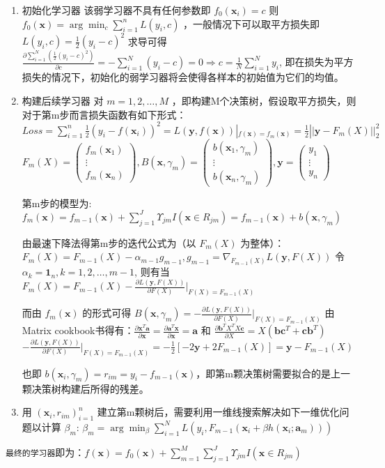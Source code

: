 \documentclass[
  letterpaper,
  DIV=11,
  numbers=noendperiod]{scrartcl}
\begin{document}
\begin{enumerate}
\def\labelenumi{\arabic{enumi}.}
\item
  初始化学习器 该弱学习器不具有任何参数即 \(f_0(\mathbf{x}_i)=c\) 则
  \(f_0(\mathbf x)=\arg\min_c\sum_{i=1}^n L(y_i,c)\)
  ，一般情况下可以取平方损失即 \(L(y_i,c)=\frac 12(y_i-c)^2\) 求导可得
  \(\frac{\partial \sum_{i=1}^N(\frac 12 (y_i-c)^2)}{\partial c}=-\sum_{i=1}^N(y_i-c)=0\Rightarrow c=\frac 1N\sum_{i=1}^N y_i\),
  即在损失为平方损失的情况下，初始化的弱学习器将会使得各样本的初始值为它们的均值。
\item
  构建后续学习器 对 \(m=1,2,\ldots,M\)
  ，即构建M个决策树，假设取平方损失，则对于第m步而言损失函数有如下形式：
  \(Loss=\sum_{i=1}^n\frac 12(y_i-f(\mathbf{x}_i))^2=L(\mathbf{y},f(\mathbf{x}))|_{f(\mathbf{x})=f_{m}(\mathbf{x})}=\frac12||\mathbf y-F_m(X)||_2^2\)
  \(F_m(X)=\begin{pmatrix}f_m(\mathbf x_1)\\\vdots\\f_m(\mathbf x_n)\end{pmatrix},B(\mathbf x,\gamma_m)=\begin{pmatrix}b(\mathbf x_1,\gamma_m)\\\vdots\\b(\mathbf x_n,\gamma_m)\end{pmatrix},\mathbf y=\begin{pmatrix}y_1\\\vdots\\ y_n\end{pmatrix}\)

  第m步的模型为:
  \(f_m(\mathbf{x})=f_{m-1}(\mathbf{x})+\sum_{j=1}^J\Upsilon_{jm}I(\mathbf{x}\in R_{jm})=f_{m-1}(\mathbf{x})+b(\mathbf{x},\gamma_m)\)

  由最速下降法得第m步的迭代公式为（以 \(F_m(X)\)
  为整体）：\(F_m(X)=F_{m-1}(X)-\alpha_{m-1}g_{m-1},g_{m-1}=\nabla_{F_{m-1}(X)} L(\mathbf{y},F(X))\)
  令 \(\alpha_k=\mathbf 1_n,k=1,2,\ldots,m-1\), 则有当
  \(F_m(X)=F_{m-1}(X)-\frac{\partial L(\mathbf y,F(X))}{\partial F(X)}|_{F(X)=F_{m-1}(X)}\)

  而由 \(f_m(\mathbf x)\) 的形式可得
  \(B(\mathbf x,\gamma_m)=-\frac{\partial L(\mathbf y,F(X))}{\partial F(X)}|_{F(X)=F_{m-1}(X)}\)
  由Matrix
  cookbook书得有：\(\frac{\partial \mathbf x^T\mathbf a}{\partial \mathbf x}=\frac{\partial \mathbf a^T\mathbf x}{\partial \mathbf x}=\mathbf a\)
  和
  \(\frac{\partial \mathbf b^TX^TX\mathbf c}{\partial X}=X(\mathbf b\mathbf c^T+\mathbf c\mathbf b^T)\)
  \(-\frac{\partial L(\mathbf y,F(X))}{\partial F(X)}|_{F(X)=F_{m-1}(X)}=-\frac 12[-2\mathbf y+2F_{m-1}(X)]=\mathbf y-F_{m-1}(X)\)

  也即
  \(b(\mathbf x_i,\gamma_m)=r_{im}=y_i-f_{m-1}(\mathbf x)\)，即第m颗决策树需要拟合的是上一颗决策树构建后所得的残差。
\item
  用 \((\mathbf x_i,r_{im})_{i=1}^n\)
  建立第m颗树后，需要利用一维线搜索解决如下一维优化问题以计算
  \(\beta_m\):
  \(\beta_m=\arg\min_{\beta}\sum_{i=1}^NL(y_i,F_{m-1}(\mathbf x_i+\beta h(\mathbf x_i;\mathbf a_m)))\)
\end{enumerate}

\texttt{最终的学习器}即为：\(f(\mathbf x)=f_0(\mathbf x)+\sum_{m=1}^M\sum_{j=1}^J\Upsilon_{jm}I(\mathbf x\in R_{jm})\)
\end{document}
